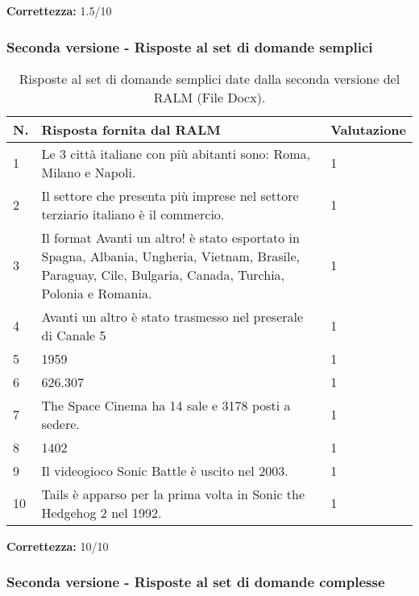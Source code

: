 \textbf{Correttezza:} 1.5/10

\subsubsection{Seconda versione - Risposte al set di domande semplici}

\begin{table}[H]
    \centering
    \begin{tabular}{|p{0.5cm} |p{6cm} |p{2cm}|}
        \hline
        \textbf{N}. & \textbf{Risposta fornita dal RALM} & \textbf{Valutazione} \\
        \hline
        1 & Le 3 città italiane con più abitanti sono: Roma, Milano e Napoli. & 1 \\
        \hline
        2 & Il settore che presenta più imprese nel settore terziario italiano è il commercio. & 1 \\
        \hline
        3 & Il format Avanti un altro! è stato esportato in Spagna, Albania, Ungheria, Vietnam, Brasile, Paraguay, Cile, Bulgaria, Canada, Turchia, Polonia e Romania. & 1 \\
        \hline
        4 & Avanti un altro è stato trasmesso  nel preserale di Canale 5 & 1 \\
        \hline
        5 & 1959 & 1 \\
        \hline
        6 & 626.307 & 1 \\
        \hline
        7 & The Space Cinema ha 14 sale e 3178 posti a sedere. & 1 \\
        \hline
        8 & 1402 & 1 \\
        \hline
        9 & Il videogioco Sonic Battle è uscito nel 2003. & 1 \\
        \hline
        10 & Tails è apparso per la prima volta in Sonic the Hedgehog 2 nel 1992. & 1 \\
        \hline
    \end{tabular}
    \caption{Risposte al set di domande semplici date dalla seconda versione del RALM (File Docx).}
\end{table}

\textbf{Correttezza:} 10/10

\subsubsection{Seconda versione - Risposte al set di domande complesse}

